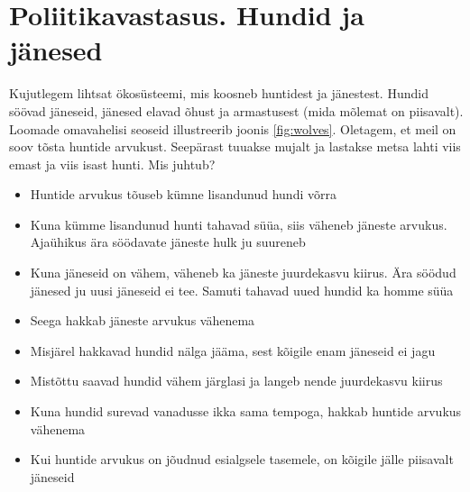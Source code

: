 \section{Poliitikavastasus. Hundid ja jänesed}

Kujutlegem lihtsat ökosüsteemi, mis koosneb huntidest ja jänestest. Hundid söövad jäneseid, jänesed elavad õhust ja armastusest (mida mõlemat on piisavalt). Loomade omavahelisi seoseid illustreerib joonis \ref{fig:wolves}. Oletagem, et meil on soov tõsta huntide arvukust. Seepärast tuuakse mujalt ja lastakse metsa lahti viis emast ja viis isast hunti. Mis juhtub? 
\begin{itemize}
	\item Huntide arvukus tõuseb kümne lisandunud hundi võrra
	\item Kuna kümme lisandunud hunti tahavad süüa, siis väheneb jäneste arvukus. Ajaühikus ära söödavate jäneste hulk ju suureneb
	\item Kuna jäneseid on vähem, väheneb ka jäneste juurdekasvu kiirus. Ära söödud jänesed ju uusi jäneseid ei tee. Samuti tahavad uued hundid ka homme süüa
	\item Seega hakkab jäneste arvukus vähenema
	\item Misjärel hakkavad hundid nälga jääma, sest kõigile enam jäneseid ei jagu
	\item Mistõttu saavad hundid vähem järglasi ja langeb nende juurdekasvu kiirus
	\item Kuna hundid surevad vanadusse ikka sama tempoga, hakkab huntide arvukus vähenema
	\item Kui huntide arvukus on jõudnud esialgsele tasemele, on kõigile jälle piisavalt jäneseid 
\end{itemize}

